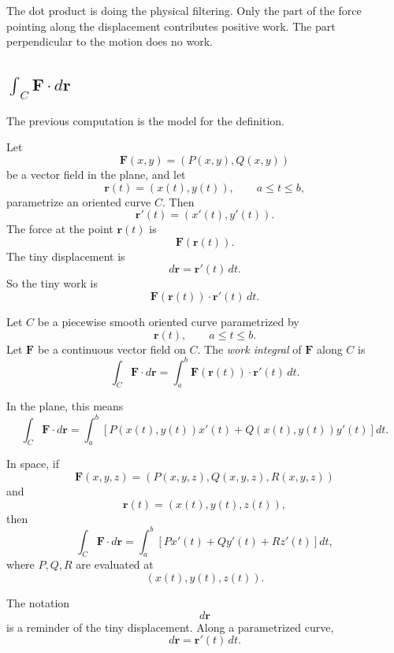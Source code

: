 The dot product is doing the physical filtering.  Only the part of the force pointing
along the displacement contributes positive work.  The part perpendicular to the motion
does no work.

\subsection{\texorpdfstring{\(\int_C \mathbf F\cdot d\mathbf r\)}{integral F dot dr}}

The previous computation is the model for the definition.

Let
\[
    \mathbf F(x,y)=(P(x,y),Q(x,y))
\]
be a vector field in the plane, and let
\[
    \mathbf r(t)=(x(t),y(t)),
    \qquad
    a\le t\le b,
\]
parametrize an oriented curve \(C\).  Then
\[
    \mathbf r'(t)=(x'(t),y'(t)).
\]
The force at the point \(\mathbf r(t)\) is
\[
    \mathbf F(\mathbf r(t)).
\]
The tiny displacement is
\[
    d\mathbf r=\mathbf r'(t)\,dt.
\]
So the tiny work is
\[
    \mathbf F(\mathbf r(t))\cdot \mathbf r'(t)\,dt.
\]

\begin{definition}
Let \(C\) be a piecewise smooth oriented curve parametrized by
\[
    \mathbf r(t),
    \qquad
    a\le t\le b.
\]
Let \(\mathbf F\) be a continuous vector field on \(C\).  The \emph{work integral} of
\(\mathbf F\) along \(C\) is
\[
\boxed{
    \int_C \mathbf F\cdot d\mathbf r
    =
    \int_a^b \mathbf F(\mathbf r(t))\cdot \mathbf r'(t)\,dt.
}
\]
\end{definition}

In the plane, this means
\[
\boxed{
    \int_C \mathbf F\cdot d\mathbf r
    =
    \int_a^b
    \left[
        P(x(t),y(t))x'(t)
        +
        Q(x(t),y(t))y'(t)
    \right]dt.
}
\]

In space, if
\[
    \mathbf F(x,y,z)=(P(x,y,z),Q(x,y,z),R(x,y,z))
\]
and
\[
    \mathbf r(t)=(x(t),y(t),z(t)),
\]
then
\[
\boxed{
    \int_C \mathbf F\cdot d\mathbf r
    =
    \int_a^b
    \left[
        P x'(t)+Q y'(t)+R z'(t)
    \right]dt,
}
\]
where \(P,Q,R\) are evaluated at
\[
    (x(t),y(t),z(t)).
\]

The notation
\[
    d\mathbf r
\]
is a reminder of the tiny displacement.  Along a parametrized curve,
\[
    d\mathbf r=\mathbf r'(t)\,dt.
\]

